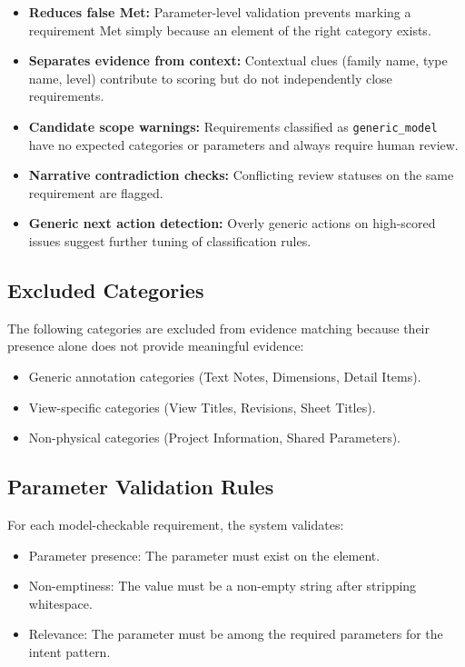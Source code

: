 \documentclass[10pt,letterpaper]{article}
\newcommand{\code}[1]{\texttt{#1}}
\begin{document}
\begin{itemize}
  \item \textbf{Reduces false Met:} Parameter-level validation prevents marking a requirement Met
        simply because an element of the right category exists.
  \item \textbf{Separates evidence from context:} Contextual clues (family name, type name, level)
        contribute to scoring but do not independently close requirements.
  \item \textbf{Candidate scope warnings:} Requirements classified as \code{generic\_model} have no
        expected categories or parameters and always require human review.
  \item \textbf{Narrative contradiction checks:} Conflicting review statuses on the same requirement
        are flagged.
  \item \textbf{Generic next action detection:} Overly generic actions on high-scored issues suggest
        further tuning of classification rules.
\end{itemize}

\subsection{Excluded Categories}

The following categories are excluded from evidence matching because their presence alone does not
provide meaningful evidence:
\begin{itemize}
  \item Generic annotation categories (Text Notes, Dimensions, Detail Items).
  \item View-specific categories (View Titles, Revisions, Sheet Titles).
  \item Non-physical categories (Project Information, Shared Parameters).
\end{itemize}

\subsection{Parameter Validation Rules}

For each model-checkable requirement, the system validates:
\begin{itemize}
  \item Parameter presence: The parameter must exist on the element.
  \item Non-emptiness: The value must be a non-empty string after stripping whitespace.
  \item Relevance: The parameter must be among the required parameters for the intent pattern.
\end{itemize}
\end{document}
